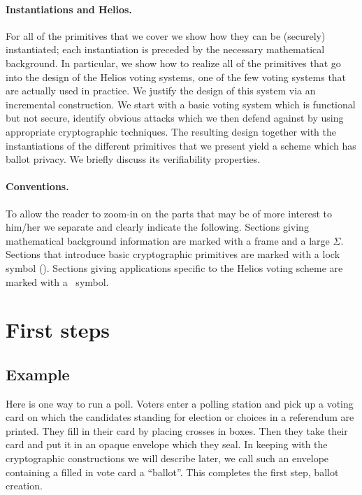 \documentclass[envcountsame]{llncs}
\begin{document}
\paragraph{Instantiations and Helios.}
For all of the primitives that we cover we show how they can be (securely) instantiated; each instantiation is preceded by the necessary mathematical background.   
In particular, we show how to realize all of the primitives that go into the design of the Helios voting systems, one of the few voting systems that are actually used in practice.
We justify the design of this system via an incremental construction.  We start with a basic voting system which is functional but not secure, identify obvious attacks which we then defend against by using appropriate cryptographic techniques. The resulting design together with the instantiations of the different primitives that we present yield a scheme which has ballot privacy.  We briefly discuss its verifiability properties. 


\paragraph{Conventions.}  
To allow the reader to zoom-in on the parts that may be of more interest to him/her we separate and clearly indicate the following.
Sections giving mathematical background information are marked with a frame and a large $\Sigma$. 
Sections that introduce basic cryptographic primitives are marked with a lock symbol (). Sections giving applications specific to the Helios voting
scheme are marked with a \Sun\ symbol. 

\section{First steps}

\subsection{Example}

Here is one way to run a poll. Voters enter a polling station and pick up a voting card on which the candidates standing for election or choices in a referendum are printed. They fill in their card by placing crosses in boxes. Then they take their card and put it in an opaque envelope which they seal. In keeping with the cryptographic constructions we will describe later, we call such an envelope containing a filled in vote card a ``ballot''. This completes the first step, ballot creation.
\end{document}
